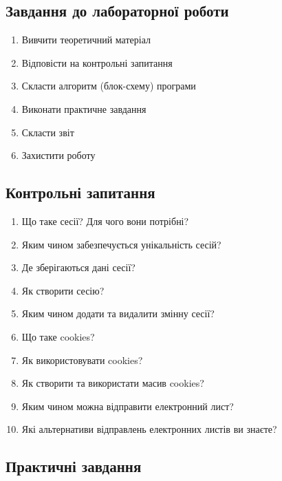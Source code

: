 \nopagebreak[4]
\subsection*{Завдання до лабораторної роботи}
\nopagebreak[4]
\begin{enumerate}
\item Вивчити теоретичний матеріал
\item Відповісти на контрольні запитання
\item Скласти алгоритм (блок-схему) програми
\item Виконати практичне завдання
\item Скласти звіт
\item Захистити роботу
\end{enumerate}

\subsection*{Контрольні запитання}
\nopagebreak[4]
\begin{enumerate}
\item Що таке сесії? Для чого вони потрібні?
\item Яким чином забезпечується унікальність сесій?
\item Де зберігаються дані сесії?
\item Як створити сесію? 
\item Яким чином додати та видалити змінну сесії?
\item Що таке cookies?
\item Як використовувати cookies?
\item Як створити та використати масив cookies?
\item Яким чином можна відправити електронний лист?
\item Які альтернативи відправлень електронних листів ви знаєте?
\end{enumerate}

\subsection*{Практичні завдання}
\nopagebreak[4]


